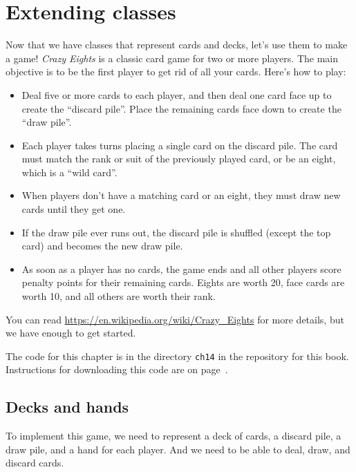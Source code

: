 \chapter{Extending classes}
\label{eights}


Now that we have classes that represent cards and decks, let's use them to make a game!
{\it Crazy Eights} is a classic card game for two or more players.
The main objective is to be the first player to get rid of all your cards.
Here's how to play:

\begin{itemize}

\item Deal five or more cards to each player, and then deal one card face up to create the ``discard pile''.
Place the remaining cards face down to create the ``draw pile''.

\item Each player takes turns placing a single card on the discard pile.
The card must match the rank or suit of the previously played card, or be an eight, which is a ``wild card''.

\item When players don't have a matching card or an eight, they must draw new cards until they get one.

\item If the draw pile ever runs out, the discard pile is shuffled (except the top card) and becomes the new draw pile.

\item As soon as a player has no cards, the game ends and all other players score penalty points for their remaining cards.
Eights are worth 20, face cards are worth 10, and all others are worth their rank.

\end{itemize}

You can read \url{https://en.wikipedia.org/wiki/Crazy_Eights} for more details, but we have enough to get started.

The code for this chapter is in the directory {\tt ch14} in the repository for this book.
Instructions for downloading this code are on page~\pageref{code}.


\section{Decks and hands}

To implement this game, we need to represent a deck of cards, a discard pile, a draw pile, and a hand for each player.
And we need to be able to deal, draw, and discard cards.

